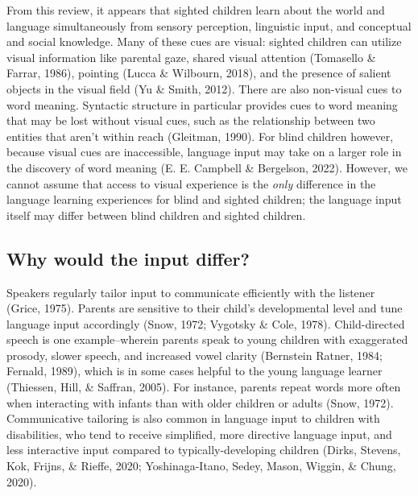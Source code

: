 \documentclass[
  man]{apa6}
\begin{document}
From this review, it appears that sighted children learn about the world and language simultaneously from sensory perception, linguistic input, and conceptual and social knowledge. Many of these cues are visual: sighted children can utilize visual information like parental gaze, shared visual attention (Tomasello \& Farrar, 1986), pointing (Lucca \& Wilbourn, 2018), and the presence of salient objects in the visual field (Yu \& Smith, 2012). There are also non-visual cues to word meaning. Syntactic structure in particular provides cues to word meaning that may be lost without visual cues, such as the relationship between two entities that aren't within reach (Gleitman, 1990). For blind children however, because visual cues are inaccessible, language input may take on a larger role in the discovery of word meaning (E. E. Campbell \& Bergelson, 2022). However, we cannot assume that access to visual experience is the \emph{only} difference in the language learning experiences for blind and sighted children; the language input itself may differ between blind children and sighted children.

\hypertarget{why-would-the-input-differ}{%
\subsection{Why would the input differ?}\label{why-would-the-input-differ}}

Speakers regularly tailor input to communicate efficiently with the listener (Grice, 1975). Parents are sensitive to their child's developmental level and tune language input accordingly (Snow, 1972; Vygotsky \& Cole, 1978). Child-directed speech is one example--wherein parents speak to young children with exaggerated prosody, slower speech, and increased vowel clarity (Bernstein Ratner, 1984; Fernald, 1989), which is in some cases helpful to the young language learner (Thiessen, Hill, \& Saffran, 2005). For instance, parents repeat words more often when interacting with infants than with older children or adults (Snow, 1972). Communicative tailoring is also common in language input to children with disabilities, who tend to receive simplified, more directive language input, and less interactive input compared to typically-developing children (Dirks, Stevens, Kok, Frijns, \& Rieffe, 2020; Yoshinaga-Itano, Sedey, Mason, Wiggin, \& Chung, 2020).
\end{document}
